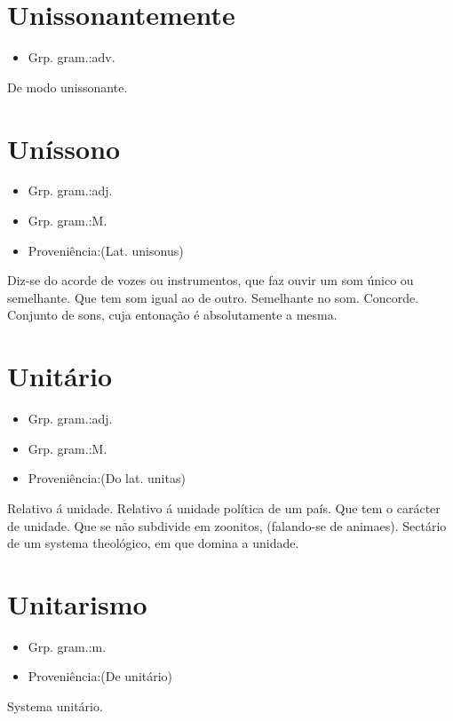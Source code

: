 \documentclass{article}
\begin{document}
\section{Unissonantemente}
\begin{itemize}
\item {Grp. gram.:adv.}
\end{itemize}
De modo unissonante.
\section{Uníssono}
\begin{itemize}
\item {Grp. gram.:adj.}
\end{itemize}
\begin{itemize}
\item {Grp. gram.:M.}
\end{itemize}
\begin{itemize}
\item {Proveniência:(Lat. \textunderscore unisonus\textunderscore )}
\end{itemize}
Diz-se do acorde de vozes ou instrumentos, que faz ouvir um som único ou semelhante.
Que tem som igual ao de outro.
Semelhante no som.
Concorde.
Conjunto de sons, cuja entonação é absolutamente a mesma.
\section{Unitário}
\begin{itemize}
\item {Grp. gram.:adj.}
\end{itemize}
\begin{itemize}
\item {Grp. gram.:M.}
\end{itemize}
\begin{itemize}
\item {Proveniência:(Do lat. \textunderscore unitas\textunderscore )}
\end{itemize}
Relativo á unidade.
Relativo á unidade política de um país.
Que tem o carácter de unidade.
Que se não subdivide em zoonitos, (falando-se de animaes).
Sectário de um systema theológico, em que domina a unidade.
\section{Unitarismo}
\begin{itemize}
\item {Grp. gram.:m.}
\end{itemize}
\begin{itemize}
\item {Proveniência:(De \textunderscore unitário\textunderscore )}
\end{itemize}
Systema unitário.
\end{document}
